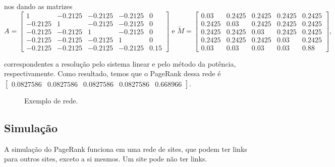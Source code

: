\documentclass{article}
\begin{document}
\noindent nos dando as matrizes
\[A = \begin{bmatrix}1 & -0.2125 & -0.2125 & -0.2125 & 0 \\ -0.2125 & 1 & -0.2125 & -0.2125 & 0 \\ -0.2125 & -0.2125 & 1 & -0.2125 & 0 \\ -0.2125 & -0.2125 & -0.2125 & 1 & 0 \\ -0.2125 & -0.2125 & -0.2125 & -0.2125 & 0.15\end{bmatrix}\text{ e }\tilde{M} = \begin{bmatrix}0.03 & 0.2425 & 0.2425 & 0.2425 & 0.2425 \\ 0.2425 & 0.03 & 0.2425 & 0.2425 & 0.2425 \\ 0.2425 & 0.2425 & 0.03 & 0.2425 & 0.2425 \\ 0.2425 & 0.2425 & 0.2425 & 0.03 & 0.2425 \\ 0.03 & 0.03 & 0.03 & 0.03 & 0.88\end{bmatrix},\]

\noindent correspondentes a resolução pelo sistema linear e pelo método da potência, respectivamente. Como resultado, temos que o PageRank dessa rede é $\begin{bmatrix}0.0827586 & 0.0827586 & 0.0827586 & 0.0827586 & 0.668966\end{bmatrix}$.

\begin{figure}[H]
    \centering
    \caption{Exemplo de rede.}
    \label{exemplo}
\end{figure}

\subsection*{Simulação}

A simulação do PageRank funciona em uma rede de sites, que podem ter links para outros sites, exceto a si mesmos. Um site pode não ter links.
\end{document}
